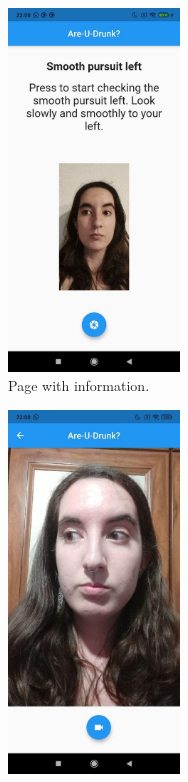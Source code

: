\begin{figure}[H]
  \centering
  \begin{subfigure}{0.33\textwidth}
      \centering
      \includegraphics[width=0.5\textwidth]{./img/clueinfo.jpg}
      \caption{Page with information.}
      \label{clueinfo}
  \end{subfigure}\hfill
  \begin{subfigure}{0.33\textwidth}
      \centering
      \includegraphics[width=0.5\textwidth]{./img/recordvideo.jpg}

\end{subfigure}
\end{figure}
